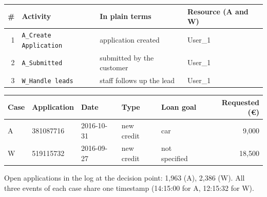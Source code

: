 \documentclass{article}
\begin{document}
\begin{minipage}{0.9\textwidth}
\makeatletter{}\makeatother

\centering
\caption{Running example: two BPIC2017 loan applications with the same prefix at their decision point, after the third event; the timing model acts on A and waits on W}
\label{tab:running}
\footnotesize
\setlength{\tabcolsep}{3pt}
\begin{tabular}{@{}rlll@{}}
\toprule
\# & Activity & In plain terms & Resource (A and W) \\
\midrule
  1 & \texttt{A\_Create Application} & application created & User\_1 \\
  2 & \texttt{A\_Submitted} & submitted by the customer & User\_1 \\
  3 & \texttt{W\_Handle leads} & staff follows up the lead & User\_1 \\
\bottomrule
\end{tabular}

\smallskip
\begin{tabular}{@{}lllllr@{}}
\toprule
Case & Application & Date & Type & Loan goal & Requested (\euro{}) \\
\midrule
  A & 381087716 & 2016-10-31 & new credit & car & 9,000 \\
  W & 519115732 & 2016-09-27 & new credit & not specified & 18,500 \\
\bottomrule
\end{tabular}

\smallskip
{\footnotesize Open applications in the log at the decision point: 1,963 (A), 2,386 (W). All three events of each case share one timestamp (14:15:00 for A, 12:15:32 for W).}


\end{minipage}
\end{document}
